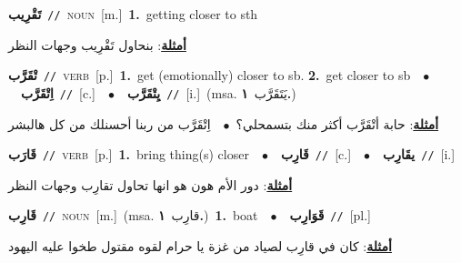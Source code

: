 \documentclass[10pt,a4paper,twoside]{article} %
\begin{document}
\begin{multicols}{2}
{\setlength\topsep{0pt}\textbf{\foreignlanguage{arabic}{تَقْرِيب}}\ {\color{gray}\texttt{//}\color{black}}\ \textsc{noun}\ [m.]\ \textbf{1.}~getting closer to sth\  \begin{flushright}\color{gray}\foreignlanguage{arabic}{\textbf{\underline{\foreignlanguage{arabic}{أمثلة}}}: بنحاول تَقْرِيب وجهات النظر}\end{flushright}\color{black}} \vspace{2mm}

{\setlength\topsep{0pt}\textbf{\foreignlanguage{arabic}{تْقَرَّب}}\ {\color{gray}\texttt{//}\color{black}}\ \textsc{verb}\ [p.]\ \textbf{1.}~get (emotionally) closer to sb.  \textbf{2.}~get closer to sb\ \ $\bullet$\ \ \setlength\topsep{0pt}\textbf{\foreignlanguage{arabic}{اِتْقَرَّب}}\ {\color{gray}\texttt{//}\color{black}}\ [c.]\ \ $\bullet$\ \ \setlength\topsep{0pt}\textbf{\foreignlanguage{arabic}{يِتْقَرَّب}}\ {\color{gray}\texttt{//}\color{black}}\ [i.]\ \color{gray}(msa. \foreignlanguage{arabic}{يَتَقَرَّب}~\foreignlanguage{arabic}{\textbf{١.}})\color{black}\  \begin{flushright}\color{gray}\foreignlanguage{arabic}{\textbf{\underline{\foreignlanguage{arabic}{أمثلة}}}: حابة أتْقَرَّب أكثر منك بتسمحلي؟\ $\bullet$\ \  اِتْقَرَّب من ربنا أحسنلك من كل هالبشر}\end{flushright}\color{black}} \vspace{2mm}

{\setlength\topsep{0pt}\textbf{\foreignlanguage{arabic}{قَارَب}}\ {\color{gray}\texttt{//}\color{black}}\ \textsc{verb}\ [p.]\ \textbf{1.}~bring thing(s) closer\ \ $\bullet$\ \ \setlength\topsep{0pt}\textbf{\foreignlanguage{arabic}{قَارِب}}\ {\color{gray}\texttt{//}\color{black}}\ [c.]\ \ $\bullet$\ \ \setlength\topsep{0pt}\textbf{\foreignlanguage{arabic}{يقَارِب}}\ {\color{gray}\texttt{//}\color{black}}\ [i.]\  \begin{flushright}\color{gray}\foreignlanguage{arabic}{\textbf{\underline{\foreignlanguage{arabic}{أمثلة}}}: دور الأم هون هو انها تحاول تقارِب وجهات النظر}\end{flushright}\color{black}} \vspace{2mm}

{\setlength\topsep{0pt}\textbf{\foreignlanguage{arabic}{قَارِب}}\ {\color{gray}\texttt{//}\color{black}}\ \textsc{noun}\ [m.]\ \color{gray}(msa. \foreignlanguage{arabic}{قارِب}~\foreignlanguage{arabic}{\textbf{١.}})\color{black}\ \textbf{1.}~boat\ \ $\bullet$\ \ \setlength\topsep{0pt}\textbf{\foreignlanguage{arabic}{قَوَارِب}}\ {\color{gray}\texttt{//}\color{black}}\ [pl.]\  \begin{flushright}\color{gray}\foreignlanguage{arabic}{\textbf{\underline{\foreignlanguage{arabic}{أمثلة}}}: كان في قارِب لصياد من غزة يا حرام لقوه مقتول طخوا عليه اليهود}\end{flushright}\color{black}} \vspace{2mm}


\end{multicols}
\end{document}
